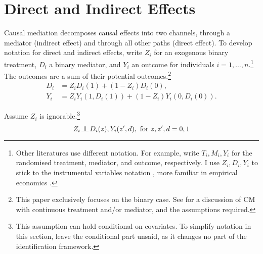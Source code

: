 \section{Direct and Indirect Effects}
\label{sec:mediation}
Causal mediation decomposes causal effects into two channels, through a mediator (indirect effect) and through all other paths (direct effect).
To develop notation for direct and indirect effects, write $Z_i$ for an exogenous binary treatment, $D_i$ a binary mediator, and $Y_i$ an outcome for individuals $i = 1, \hdots, n$.\footnote{
    Other literatures use different notation.
    For example, \cite{imai2010identification} write $T_i, M_i, Y_i$ for the randomised treatment, mediator, and outcome, respectively.
    I use $Z_i, D_i, Y_i$ to stick to the instrumental variables notation \cite{angrist1996identification}, more familiar in empirical economics \citep{angrist2009mostly}. 
}
The outcomes are a sum of their potential outcomes.\footnote{
    This paper exclusively focuses on the binary case.
    See \cite{huber2020direct} for a discussion of CM with continuous treatment and/or mediator, and the assumptions required.
}
\begin{align*}
    D_i &= Z_i       D_i(1)
        + (1 - Z_i) D_i(0),  \\
    Y_i &= Z_i       Y_i(1, D_i(1))
        + (1 - Z_i) Y_i(0, D_i(0)).
\end{align*}

Assume $Z_i$ is ignorable.\footnote{
    This assumption can hold conditional on covariates.
    To simplify notation in this section, leave the conditional part unsaid, as it changes no part of the identification framework.
}
\[ Z_i \indep  D_i(z), Y_i(z', d), \textnormal{ for } z, z', d = 0, 1 \]

